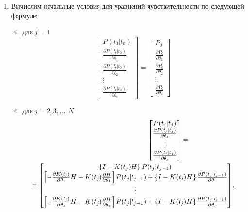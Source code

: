 \documentclass[a4paper,14pt]{extarticle}
\newcommand{\pd}[2]{\frac{\partial #1}{\partial #2}}
\begin{document}
\begin{enumerate}
\item Вычислим начальные условия для уравнений чувствительности по следующей
	формуле:
\begin{itemize}
		\item для $j=1$
\begin{equation}
	\label{eq:init_cond_1}
	\begin{bmatrix} 
		P(t_0|t_0) \\ 
		\pd{P(t_0|t_0)}{\theta_1} \\
		\pd{P(t_0|t_0)}{\theta_2} \\
		\vdots \\
		\pd{P(t_0|t_0)}{\theta_s}
	\end{bmatrix} =
	\begin{bmatrix}
		P_0 \\
		\pd{P_0}{\theta_1} \\
		\pd{P_0}{\theta_2} \\
		\vdots \\
		\pd{P_0}{\theta_s}
	\end{bmatrix}
\end{equation}
\item для $j=2,3,\ldots,N$
	\begin{multline}
		\label{eq:init_cond_2}
		\hspace{0.3\textwidth}
		\begin{bmatrix}
			P(t_j|t_j) \\
			\pd{P(t_j|t_j)}{\theta_1} \\
			\vdots \\
			\pd{P(t_j|t_j)}{\theta_s}
		\end{bmatrix} = \\ =
	  \begin{bmatrix}
			\left\{ I - K(t_j) H \right\} P(t_j|t_{j-1}) \\ 
			\left[
				-\pd{K(t_j)}{\theta_1} H - K(t_j) \pd{H}{\theta_1} \right]
			P(t_j|t_{j-1}) + \left\{ I - K(t_j) H \right\}
			\pd{P(t_j|t_{j-1})}{\theta_1} \\
			\vdots \\
			\left[
				-\pd{K(t_j)}{\theta_s} H - K(t_j) \pd{H}{\theta_s} \right]
			P(t_j|t_{j-1}) + \left\{ I - K(t_j) H \right\}
			\pd{P(t_j|t_{j-1})}{\theta_s} 
		\end{bmatrix}.
	\end{multline}
\end{itemize}

\newpage


\end{enumerate}
\end{document}
